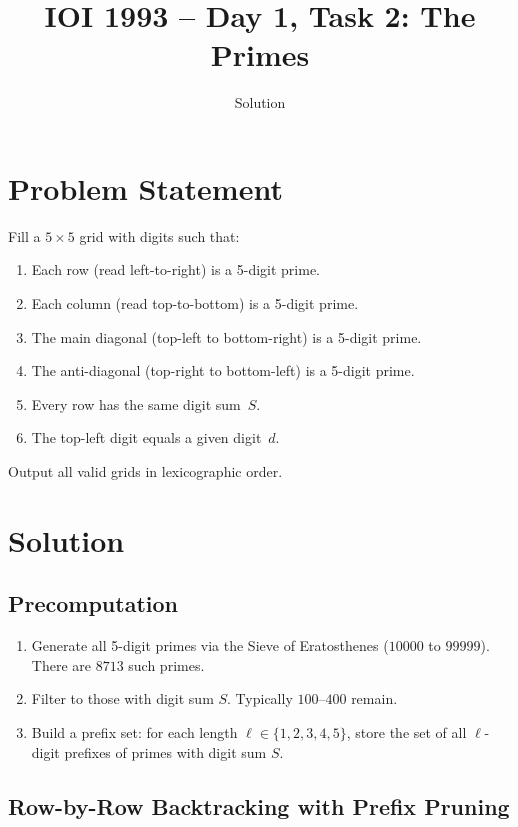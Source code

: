 \documentclass[11pt,a4paper]{article}
\title{IOI 1993 -- Day 1, Task 2: The Primes}
\author{Solution}
\date{}
\begin{document}
\maketitle

\section{Problem Statement}

Fill a $5 \times 5$ grid with digits such that:
\begin{enumerate}
  \item Each row (read left-to-right) is a 5-digit prime.
  \item Each column (read top-to-bottom) is a 5-digit prime.
  \item The main diagonal (top-left to bottom-right) is a 5-digit prime.
  \item The anti-diagonal (top-right to bottom-left) is a 5-digit prime.
  \item Every row has the same digit sum~$S$.
  \item The top-left digit equals a given digit~$d$.
\end{enumerate}

Output all valid grids in lexicographic order.

\section{Solution}

\subsection{Precomputation}

\begin{enumerate}
  \item Generate all 5-digit primes via the Sieve of Eratosthenes
    ($10000$ to $99999$). There are $8713$ such primes.
  \item Filter to those with digit sum $S$. Typically $100$--$400$ remain.
  \item Build a prefix set: for each length $\ell \in \{1, 2, 3, 4, 5\}$,
    store the set of all $\ell$-digit prefixes of primes with digit sum $S$.
\end{enumerate}

\subsection{Row-by-Row Backtracking with Prefix Pruning}
\end{document}
